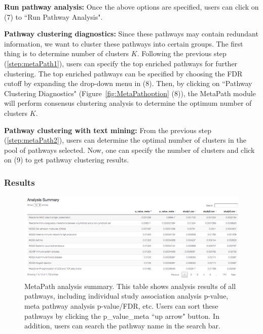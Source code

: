 \begin{steps}
\item \textbf{Run pathway analysis:}
\label{step:metaPath1}
Once the above options are specified, users can click on {\color{red}(7)} to ``Run Pathway Analysis".

\item \textbf{Pathway clustering diagnostics:} 
\label{step:metaPath2}
Since these pathways may contain redundant information, 
we want to cluster these pathways into certain groups. 
The first thing is to determine number of clusters $K$.
Following the previous step (\ref{step:metaPath1}), 
users can specify the top enriched pathways for further clustering. 
The top enriched pathways can be specified by choosing the FDR cutoff by expanding the drop-down menu in {\color{red}(8)}.
Then, by clicking on ``Pathway Clustering Diagnostics" (Figure~\ref{fig:MetaPathoption} {\color{red}(8)}),
the MetaPath module will perform consensus clustering analysis to determine the optimum number of clusters $K$.


\item \textbf{Pathway clustering with text mining:} 
\label{step:metaPath3}
From the previous step (\ref{step:metaPath2}), users can determine the optimal number of clusters in the pool of pathways selected. 
Now, one can specify the number of clusters and click on {\color{red}(9)} to get pathway clustering results. 
\end{steps}




\subsubsection{Results}

\begin{figure}[H]
\begin{center}
\includegraphics[scale=0.4]{./figure/metaPath/metaPathresult1.png}
\caption{MetaPath analysis summary. 
This table shows analysis results of all pathways, 
including individual study association analysis p-value, meta pathway analysis p-value/FDR, etc. 
Users can sort these pathways by clicking the p\_value\_meta ``up arrow" button.
In addition, users can search the pathway  name in the search bar.
}
\label{fig:MetaPathresult1}
\end{center}
\end{figure}

